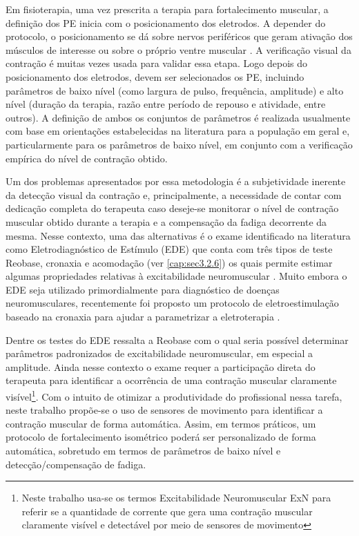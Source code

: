 Em fisioterapia, uma vez prescrita a terapia para fortalecimento muscular, a definição dos \acrshort{PE} inicia com o posicionamento dos eletrodos. A depender do protocolo, o posicionamento se dá sobre nervos periféricos que geram ativação dos músculos de interesse ou sobre o próprio ventre muscular \cite{Kitchen2003EletroterapiaEvidencias}. A verificação visual da contração é muitas vezes usada para validar essa etapa. Logo depois do posicionamento dos eletrodos, devem ser selecionados os PE, incluindo parâmetros de baixo nível (como largura de pulso, frequência, amplitude) e alto nível (duração da terapia, razão entre período de repouso e atividade, entre outros). A definição de ambos os conjuntos de parâmetros é realizada usualmente com base em orientações estabelecidas na literatura para a população em geral e, particularmente para os parâmetros de baixo nível, em conjunto com a verificação empírica do nível de contração obtido. 

Um dos problemas apresentados por essa metodologia é a subjetividade inerente da detecção visual da contração e, principalmente, a necessidade de contar com dedicação completa do terapeuta caso deseje-se monitorar o nível de contração muscular obtido durante a terapia e a compensação da fadiga decorrente da mesma. Nesse contexto, uma das alternativas é o exame identificado na literatura como Eletrodiagnóstico de Estímulo (\acrshort{EDE}) que conta com três tipos de teste Reobase, cronaxia e acomodação (ver \ref{cap:sec3.2.6}) os quais permite estimar algumas propriedades relativas à excitabilidade neuromuscular \cite{Kimura2013ElectrodiagnosisMuscle}. Muito embora o \acrshort{EDE} seja utilizado primordialmente para diagnóstico de doenças neuromusculares, recentemente foi proposto um protocolo de eletroestimulação baseado na cronaxia para ajudar a parametrizar a eletroterapia \cite{Silva2016SafetyStudy.}.  

Dentre os testes do \acrshort{EDE} ressalta a Reobase
com o qual seria possível determinar parâmetros padronizados de excitabilidade neuromuscular, em especial a amplitude. Ainda nesse contexto o exame requer a participação direta do terapeuta para identificar a ocorrência de uma contração muscular claramente visível\footnote{Neste trabalho usa-se os termos Excitabilidade Neuromuscular \acrshort{ExN} para referir se a quantidade de corrente que gera uma contração muscular claramente visível e detectável por meio de sensores de movimento}. Com o intuito de otimizar a produtividade do profissional nessa tarefa, neste trabalho propõe-se o uso de sensores de movimento para identificar a contração muscular de forma automática. Assim, em termos práticos, um protocolo de fortalecimento isométrico poderá ser personalizado de forma automática, sobretudo em termos de parâmetros de baixo nível e detecção/compensação de fadiga.

